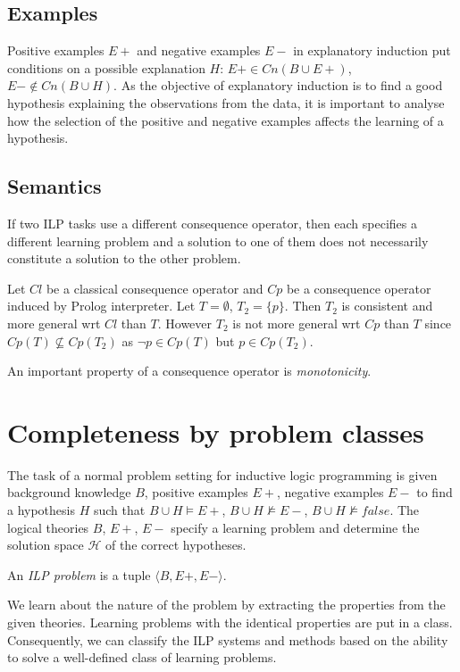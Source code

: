 \subsection{Examples}
Positive examples $E+$ and negative examples $E-$ in explanatory induction put conditions on a possible explanation $H$: $E+ \in Cn(B \cup E+)$, $E- \not \in Cn(B \cup H)$. As the objective of explanatory induction is to find a good hypothesis explaining the observations from the data, it is important to analyse how the selection of the positive and negative examples affects the learning of a hypothesis.

\subsection{Semantics}
If two ILP tasks use a different consequence operator, then each specifies a different learning problem and a solution to one of them does not necessarily constitute a solution to the other problem.

\begin{exmp}
Let $Cl$ be a classical consequence operator and $Cp$ be a consequence operator induced by Prolog interpreter. Let $T=\emptyset$, $T_2=\{p\}$.
Then $T_2$ is consistent and more general wrt $Cl$ than $T$. However $T_2$ is not more general wrt $Cp$ than $T$ since $Cp(T) \not\subseteq Cp(T_2)$ as $\neg p \in Cp(T)$ but $p \in Cp(T_2)$.
\end{exmp}

An important property of a consequence operator is \emph{monotonicity}.

\section{Completeness by problem classes}
The task of a normal problem setting for inductive logic programming is given background knowledge $B$, positive examples $E+$, negative examples $E-$ to find a hypothesis $H$ such that $B \cup H \models E+$,
$B \cup H \not\models E-$,
$B \cup H \not\models false$.
The logical theories $B$, $E+$, $E-$ specify a learning problem and determine the solution space $\mathcal{H}$ of the correct hypotheses.

\begin{defn}
An \emph{ILP problem} is a tuple $\langle B, E+, E- \rangle$.
\end{defn}

We learn about the nature of the problem by extracting the properties from the given theories. Learning problems with the identical properties are put in a class. Consequently, we can classify the ILP systems and methods based on the ability to solve a well-defined class of learning problems.

